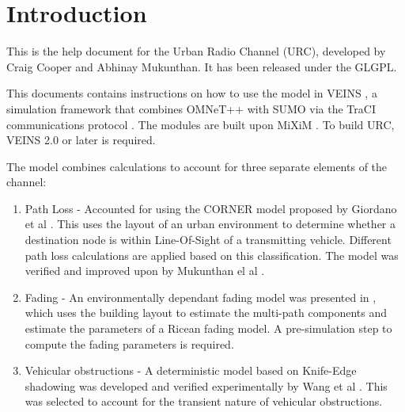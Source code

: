\section{Introduction}

This is the help document for the Urban Radio Channel (URC), developed by Craig Cooper and Abhinay Mukunthan. It has been released under the GLGPL.

This documents contains instructions on how to use the model in VEINS \cite{sommer_veins_2010}, a simulation framework that combines OMNeT++ \cite{varga_omnet++_2009} with SUMO \cite{krajzewicz_sumo_2011} via the TraCI communications protocol \cite{wegener_traci:_2008}. The modules are built upon MiXiM \cite{viklund_mixim_2011}. To build URC, VEINS 2.0 or later is required.

The model combines calculations to account for three separate elements of the channel:
\begin{enumerate}
 \item Path Loss - Accounted for using the CORNER model proposed by Giordano et al \cite{giordano_corner:_2011}. This uses the layout of an urban environment to determine whether a destination node is within Line-Of-Sight of a transmitting vehicle. Different path loss calculations are applied based on this classification. The model was verified and improved upon by Mukunthan el al \cite{mukunthan_experimental_2013}.
 \item Fading - An environmentally dependant fading model was presented in \cite{cooper_dynamic_2014}, which uses the building layout to estimate the multi-path components and estimate the parameters of a Ricean fading model. A pre-simulation step to compute the fading parameters is required.
 \item Vehicular obstructions - A deterministic model based on Knife-Edge shadowing was developed and verified experimentally by Wang et al \cite{wang_influence_2009}. This was selected to account for the transient nature of vehicular obstructions.
\end{enumerate}

